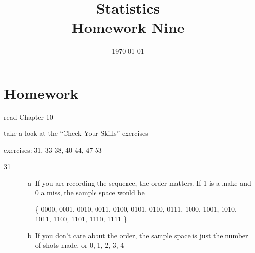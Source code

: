 \documentclass[letterpaper, landscape]{exam}
\title{Statistics \\ Homework Nine}
\date{\today}
\author{}
\begin{document}
  \maketitle

  \section{Homework}
  \ifprintanswers
  \else
    \begin{itemize*}
      \item read Chapter 10 
      \item take a look at the ``Check Your Skills'' exercises
      \item exercises: 31, 33-38, 40-44, 47-53
    \end{itemize*}
  \fi

  \ifprintanswers
    \begin{description}

      \item[31] 
        \begin{enumerate}[(a)]
          \item If you are recording the sequence, the order matters.  If 1 is a
            make and 0 a miss, the sample space would be 
            
            \{ 0000, 0001, 0010, 0011, 0100, 0101, 0110, 0111, 1000, 1001, 1010,
               1011, 1100, 1101, 1110, 1111 \}

          \item If you don't care about the order, the sample space is just the
            number of shots made, or {0, 1, 2, 3, 4 }

        \end{enumerate}





\end{description}
\end{document}
